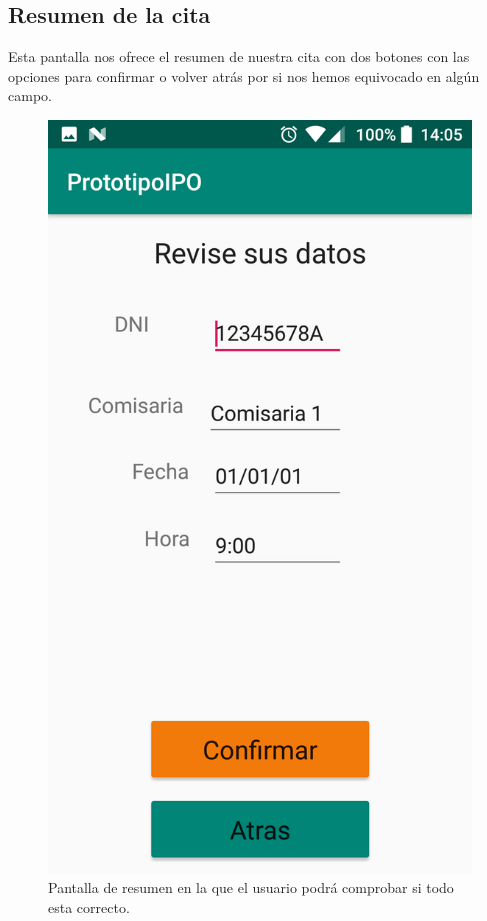 \documentclass[a4paper,11pt]{article}
\begin{document}
\subsection{Resumen de la cita}
Esta pantalla nos ofrece el resumen de nuestra cita con dos botones con las opciones para confirmar o volver atrás por si nos hemos equivocado en algún campo.
\begin{figure}[H]
  \centering
  \includegraphics[scale=0.2]{11.png}
  \caption{Pantalla de resumen en la que el usuario podrá comprobar si todo esta correcto.}
  \label{resumen}
\end{figure}
\end{document}
